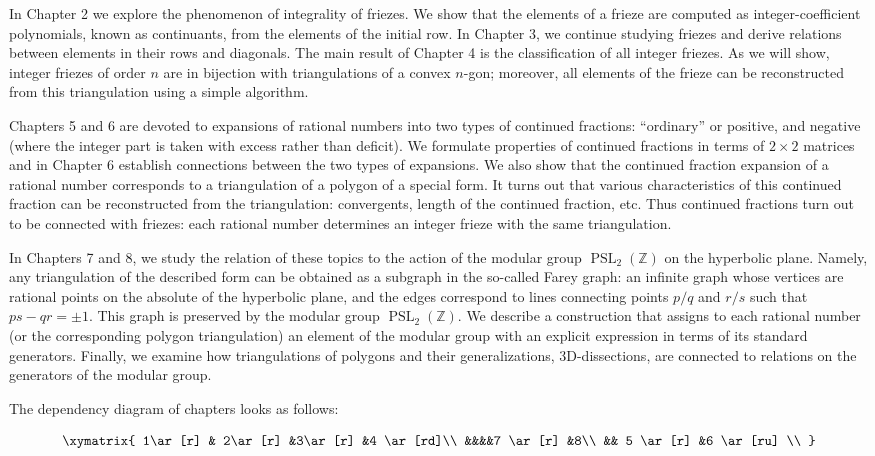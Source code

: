 \documentclass[a4paper,11pt]{amsart}
\newcommand{\ZZ}{{\mathbb{Z}}}
\newcommand{\PSL}{\mathop{\mathrm{PSL}}}
\theoremstyle{plain}
\theoremstyle{remark}
\theoremstyle{definition}
\numberwithin{equation}{section}
\numberwithin{figure}{section}
\begin{document}
In Chapter 2 we explore the phenomenon of integrality of friezes. We show that the elements of a frieze are computed as integer-coefficient polynomials, known as continuants, from the elements of the initial row. In Chapter 3, we continue studying friezes and derive relations between elements in their rows and diagonals. The main result of Chapter 4 is the classification of all integer friezes. As we will show, integer friezes of order $n$ are in bijection with triangulations of a convex $n$-gon; moreover, all elements of the frieze can be reconstructed from this triangulation using a simple algorithm.

Chapters 5 and 6 are devoted to expansions of rational numbers into two types of continued fractions: ``ordinary'' or positive, and negative (where the integer part is taken with excess rather than deficit). We formulate properties of continued fractions in terms of $2\times 2$ matrices and in Chapter 6 establish connections between the two types of expansions. We also show that the continued fraction expansion of a rational number corresponds to a triangulation of a polygon of a special form. It turns out that various characteristics of this continued fraction can be reconstructed from the triangulation: convergents, length of the continued fraction, etc. Thus continued fractions turn out to be connected with friezes: each rational number determines an integer frieze with the same triangulation.

In Chapters 7 and 8, we study the relation of these topics to  the action of the modular group $\PSL_2(\ZZ)$ on the hyperbolic plane. Namely, any triangulation of the described form can be obtained as a subgraph in the so-called Farey graph: an infinite graph whose vertices are rational points on the absolute of the hyperbolic plane, and the edges correspond to lines connecting points $p/q$ and $r/s$ such that $ps-qr=\pm 1$. This graph is preserved by the modular group $\PSL_2(\ZZ)$. We describe a construction that assigns to each rational number (or the corresponding polygon triangulation) an element of the modular group with an explicit expression in terms of  its standard generators. Finally, we examine how triangulations of polygons and their generalizations, 3D-dissections, are connected to relations on the generators of the modular group.

\bigskip

The dependency diagram of chapters looks as follows:

\[
\xymatrix{
1\ar[r] & 2\ar[r] &3\ar[r] &4 \ar[rd]\\
&&&&7 \ar[r] &8\\
&& 5 \ar[r] &6 \ar[ru] \\
}
\]
\end{document}
